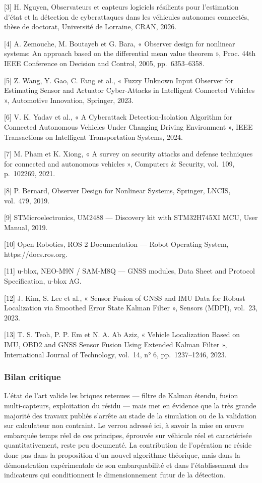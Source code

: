 [3] H. Nguyen, Observateurs et capteurs logiciels résilients pour l’estimation d’état et la détection de cyberattaques dans les véhicules autonomes connectés, thèse de doctorat, Université de Lorraine, CRAN, 2026.

[4] A. Zemouche, M. Boutayeb et G. Bara, « Observer design for nonlinear systems: An approach based on the differential mean value theorem », Proc. 44th IEEE Conference on Decision and Control, 2005, pp.~6353–6358.

[5] Z. Wang, Y. Gao, C. Fang et al., « Fuzzy Unknown Input Observer for Estimating Sensor and Actuator Cyber-Attacks in Intelligent Connected Vehicles », Automotive Innovation, Springer, 2023.

[6] V. K. Yadav et al., « A Cyberattack Detection-Isolation Algorithm for Connected Autonomous Vehicles Under Changing Driving Environment », IEEE Transactions on Intelligent Transportation Systems, 2024.

[7] M. Pham et K. Xiong, « A survey on security attacks and defense techniques for connected and autonomous vehicles », Computers \& Security, vol.~109, p.~102269, 2021.

[8] P. Bernard, Observer Design for Nonlinear Systems, Springer, LNCIS, vol.~479, 2019.

[9] STMicroelectronics, UM2488 — Discovery kit with STM32H745XI MCU, User Manual, 2019.

[10] Open Robotics, ROS 2 Documentation — Robot Operating System, https://docs.ros.org.

[11] u-blox, NEO-M9N / SAM-M8Q — GNSS modules, Data Sheet and Protocol Specification, u-blox AG.

[12] J. Kim, S. Lee et al., « Sensor Fusion of GNSS and IMU Data for Robust Localization via Smoothed Error State Kalman Filter », Sensors (MDPI), vol.~23, 2023.

[13] T. S. Teoh, P. P. Em et N. A. Ab Aziz, « Vehicle Localization Based on IMU, OBD2 and GNSS Sensor Fusion Using Extended Kalman Filter », International Journal of Technology, vol.~14, n° 6, pp.~1237–1246, 2023.

\subsubsection{Bilan critique}

L’état de l’art valide les briques retenues — filtre de Kalman étendu, fusion multi-capteurs, exploitation du résidu — mais met en évidence que la très grande majorité des travaux publiés s’arrête au stade de la simulation ou de la validation sur calculateur non contraint. Le verrou adressé ici, à savoir la mise en œuvre embarquée temps réel de ces principes, éprouvée sur véhicule réel et caractérisée quantitativement, reste peu documenté. La contribution de l’opération ne réside donc pas dans la proposition d’un nouvel algorithme théorique, mais dans la démonstration expérimentale de son embarquabilité et dans l’établissement des indicateurs qui conditionnent le dimensionnement futur de la détection.

